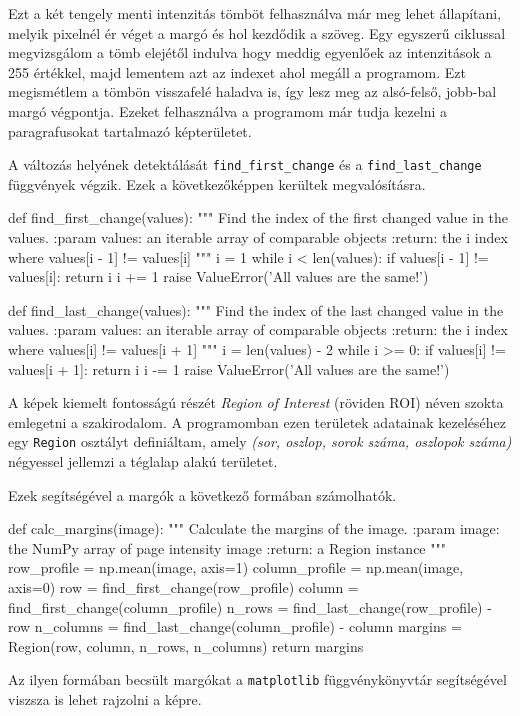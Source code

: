 Ezt a két tengely menti intenzitás tömböt felhasználva már meg lehet állapítani, melyik pixelnél ér véget a margó és hol kezdődik a szöveg. Egy egyszerű ciklussal megvizsgálom a tömb elejétől indulva hogy meddig egyenlőek az intenzitások a 255 értékkel, majd lementem azt az indexet ahol megáll a programom. Ezt megismétlem a tömbön visszafelé haladva is, így lesz meg az alsó-felső, jobb-bal margó végpontja. Ezeket felhasználva a programom már tudja kezelni a paragrafusokat tartalmazó képterületet.

A változás helyének detektálását \texttt{find\_first\_change} és a \texttt{find\_last\_change} függvények végzik.
Ezek a következőképpen kerültek megvalósításra.
\begin{python}
def find_first_change(values):
    """
    Find the index of the first changed value in the values.
    :param values: an iterable array of comparable objects
    :return: the i index where values[i - 1] != values[i]
    """
    i = 1
    while i < len(values):
        if values[i - 1] != values[i]:
            return i
        i += 1
    raise ValueError('All values are the same!')
\end{python}

\begin{python}
def find_last_change(values):
    """
    Find the index of the last changed value in the values.
    :param values: an iterable array of comparable objects
    :return: the i index where values[i] != values[i + 1]
    """
    i = len(values) - 2
    while i >= 0:
        if values[i] != values[i + 1]:
            return i
        i -= 1
    raise ValueError('All values are the same!')
\end{python}

A képek kiemelt fontosságú részét \textit{Region of Interest} (röviden ROI) néven szokta emlegetni a szakirodalom. A programomban ezen területek adatainak kezeléséhez egy \texttt{Region} osztályt definiáltam, amely \textit{(sor, oszlop, sorok száma, oszlopok száma)} négyessel jellemzi a téglalap alakú területet.

Ezek segítségével a margók a következő formában számolhatók.
\begin{python}
def calc_margins(image):
    """
    Calculate the margins of the image.
    :param image: the NumPy array of page intensity image
    :return: a Region instance
    """
    row_profile = np.mean(image, axis=1)
    column_profile = np.mean(image, axis=0)
    row = find_first_change(row_profile)
    column = find_first_change(column_profile)
    n_rows = find_last_change(row_profile) - row
    n_columns = find_last_change(column_profile) - column
    margins = Region(row, column, n_rows, n_columns)
    return margins
\end{python}
Az ilyen formában becsült margókat a \texttt{matplotlib} függvénykönyvtár segítségével visz\-sza is lehet rajzolni a képre.

